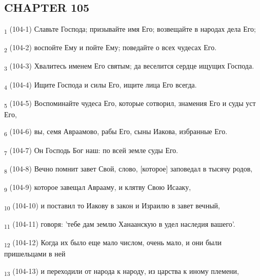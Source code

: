 \subsection{CHAPTER 105}
\begin{tcolorbox}
\textsubscript{1} (104-1) Славьте Господа; призывайте имя Его; возвещайте в народах дела Его;
\end{tcolorbox}
\begin{tcolorbox}
\textsubscript{2} (104-2) воспойте Ему и пойте Ему; поведайте о всех чудесах Его.
\end{tcolorbox}
\begin{tcolorbox}
\textsubscript{3} (104-3) Хвалитесь именем Его святым; да веселится сердце ищущих Господа.
\end{tcolorbox}
\begin{tcolorbox}
\textsubscript{4} (104-4) Ищите Господа и силы Его, ищите лица Его всегда.
\end{tcolorbox}
\begin{tcolorbox}
\textsubscript{5} (104-5) Воспоминайте чудеса Его, которые сотворил, знамения Его и суды уст Его,
\end{tcolorbox}
\begin{tcolorbox}
\textsubscript{6} (104-6) вы, семя Авраамово, рабы Его, сыны Иакова, избранные Его.
\end{tcolorbox}
\begin{tcolorbox}
\textsubscript{7} (104-7) Он Господь Бог наш: по всей земле суды Его.
\end{tcolorbox}
\begin{tcolorbox}
\textsubscript{8} (104-8) Вечно помнит завет Свой, слово, [которое] заповедал в тысячу родов,
\end{tcolorbox}
\begin{tcolorbox}
\textsubscript{9} (104-9) которое завещал Аврааму, и клятву Свою Исааку,
\end{tcolorbox}
\begin{tcolorbox}
\textsubscript{10} (104-10) и поставил то Иакову в закон и Израилю в завет вечный,
\end{tcolorbox}
\begin{tcolorbox}
\textsubscript{11} (104-11) говоря: 'тебе дам землю Ханаанскую в удел наследия вашего'.
\end{tcolorbox}
\begin{tcolorbox}
\textsubscript{12} (104-12) Когда их было еще мало числом, очень мало, и они были пришельцами в ней
\end{tcolorbox}
\begin{tcolorbox}
\textsubscript{13} (104-13) и переходили от народа к народу, из царства к иному племени,
\end{tcolorbox}
